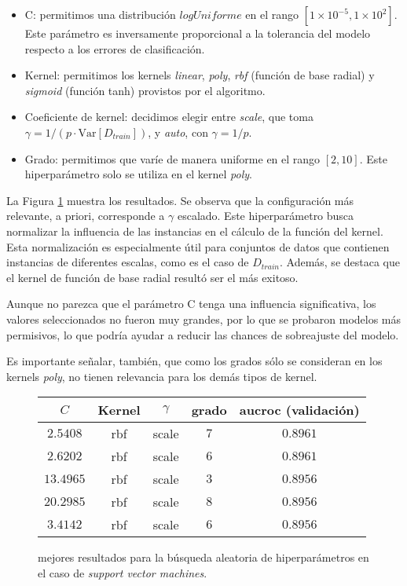 \begin{itemize}
    \item C: permitimos una distribución $\textit{logUniforme}$ en el rango $[1\times10^{-5}, 1\times10^{2}]$. Este parámetro es inversamente proporcional a la tolerancia del modelo respecto a los errores de clasificación.
    \item Kernel: permitimos los kernels \textit{linear}, \textit{poly}, \textit{rbf} (función de base radial) y \textit{sigmoid} (función tanh) provistos por el algoritmo.
    \item Coeficiente de kernel: decidimos elegir entre \textit{scale}, que toma $\gamma = 1/(p\cdot\text{Var}[D_{train}])$, y \textit{auto}, con $\gamma = 1/p$.
    \item Grado: permitimos que varíe de manera uniforme en el rango $[2, 10]$. Este hiperparámetro solo se utiliza en el kernel \textit{poly}.
\end{itemize}

La Figura \ref{support vector machines} muestra los resultados. Se observa que la configuración más relevante, a priori, corresponde a $\gamma$ escalado. Este hiperparámetro busca normalizar la influencia de las instancias en el cálculo de la función del kernel. Esta normalización es especialmente útil para conjuntos de datos que contienen instancias de diferentes escalas, como es el caso de $D_{train}$. Además, se destaca que el kernel de función de base radial resultó ser el más exitoso. 

Aunque no parezca que el parámetro C tenga una influencia significativa, los valores seleccionados no fueron muy grandes, por lo que se probaron modelos más permisivos, lo que podría ayudar a reducir las chances de sobreajuste del modelo. 

Es importante señalar, también, que como los grados sólo se consideran en los kernels \textit{poly}, no tienen relevancia para los demás tipos de kernel.

\vspace{0.5em}
\begin{figure}[!htbp]
    \begin{center}
        \begin{tabular}{ |c|c|c|c|c| } 
         \hline
        $C$ & Kernel & $\gamma$ & grado & aucroc (validación) \\
        \hline
        $2.5408$ & rbf     & scale & $7$ & $0.8961$ \\ 
        $2.6202$ & rbf    & scale & $6$ & $0.8961$ \\
        $13.4965$ & rbf   & scale & $3$ & $0.8956$ \\ 
        $20.2985$ & rbf   & scale & $8$ & $0.8956$ \\
        $3.4142$ & rbf    & scale & $6$ & $0.8956$ \\ 
        \hline
        \end{tabular}
    \end{center}
    \caption{mejores resultados para la búsqueda aleatoria de hiperparámetros en el caso de \textit{support vector machines}.} \label{support vector machines}
\end{figure}

